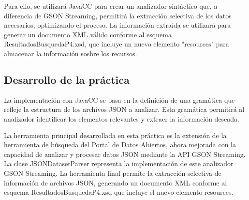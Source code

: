 

Para ello, se utilizará JavaCC para crear un analizador sintáctico que, a diferencia de GSON Streaming, permitirá la extracción selectiva de los datos necesarios, optimizando el proceso. La información extraída se utilizará para generar un documento XML válido conforme al esquema ResultadosBusquedaP4.xsd, que incluye un nuevo elemento "resources" para almacenar la información sosbre los recursos.

\subsection{Desarrollo de la práctica}

La implementación con JavaCC se basa en la definición de una gramática que refleje la estructura de los archivos JSON a analizar. Esta gramática permitirá al analizador identificar los elementos relevantes y extraer la información deseada.






\noindent La herramienta principal desarrollada en esta práctica es la extensión de la herramienta de búsqueda del Portal de Datos Abiertos, ahora mejorada con la capacidad de analizar y procesar datos JSON mediante la API GSON Streaming. La clase JSONDatasetParser representa la implementación de este analizador GSON Streaming. La herramienta final permite la extracción selectiva de información de archivos JSON, generando un documento XML conforme al esquema ResultadosBusquedaP4.xsd que incluye el nuevo elemento resources.

